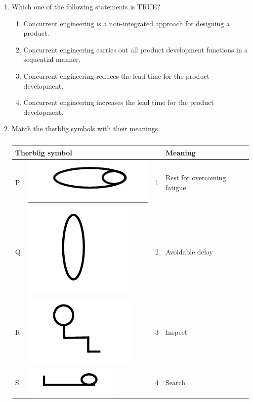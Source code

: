 \documentclass[journal,12pt,onecolumn]{IEEEtran}
\theoremstyle{remark}
\begin{document}
\begin{enumerate}
    \item Which one of the following statements is TRUE?

    \hfill{}
    \begin{enumerate}
        \item Concurrent engineering is a non-integrated approach for designing a product.
        \item Concurrent engineering carries out all product development functions in a sequential manner.
        \item Concurrent engineering reduces the lead time for the product development.
        \item Concurrent engineering increases the lead time for the product development.
    \end{enumerate}

    \item Match the therblig symbols with their meanings.
    \begin{table}[H]
        \centering
        \caption*{}
        \label{tab:q21}
        \begin{tabular}{llcl}
            \hline
            \multicolumn{2}{l}{Therblig symbol} & & Meaning \\
            \hline
            P & \includegraphics[width=0.02\columnwidth]{a21P.png} & 1 & Rest for overcoming fatigue \\
            Q & \includegraphics[width=0.02\columnwidth]{a21Q.png} & 2 & Avoidable delay \\
            R & \includegraphics[width=0.02\columnwidth]{a21R.png} & 3 & Inspect \\
            S & \includegraphics[width=0.02\columnwidth]{a21S.png} & 4 & Search \\
            \hline
        \end{tabular}
    \end{table}

    \hfill{}
    \begin{enumerate}
    \end{enumerate}


\end{enumerate}
\end{document}
